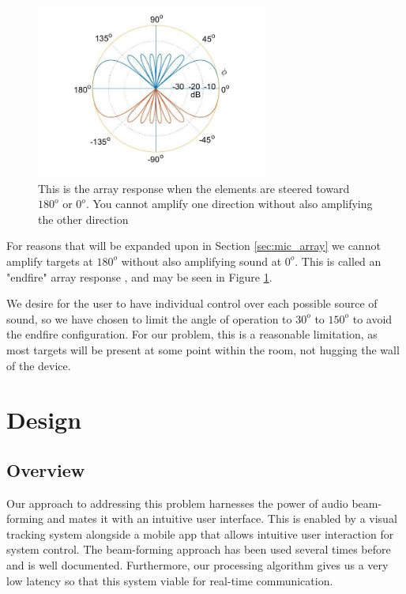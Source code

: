\documentclass[10pt,journal,compsoc]{IEEEtran}
\begin{document}
\begin{figure}
    \centering
    \includegraphics[width=3in]{endfire}
    \caption{This is the array response when the elements are steered toward $180^o$ or $0^o$. You cannot amplify one direction without also amplifying the other direction}
    \label{fig:endfire}
\end{figure}

For reasons that will be expanded upon in Section \ref{sec:mic_array} we cannot amplify targets at $180^o$ without also amplifying sound at $0^o$. This is called an "endfire" array response , and may be seen in Figure \ref{fig:endfire}.

We desire for the user to have individual control over each possible source of sound, so we have chosen to limit the angle of operation to $30^o$ to $150^o$ to avoid the endfire configuration. For our problem, this is a reasonable limitation, as most targets will be present at some point within the room, not hugging the wall of the device.




\section{Design}

\subsection{Overview}

Our approach to addressing this problem harnesses the power of audio beam-forming and mates it with an intuitive user interface.  This is enabled by a visual tracking system alongside a mobile app that allows intuitive user interaction for system control.  The beam-forming approach has been used several times before and is well documented.  Furthermore, our processing algorithm gives us a very low latency so that this system viable for real-time communication.
\end{document}
